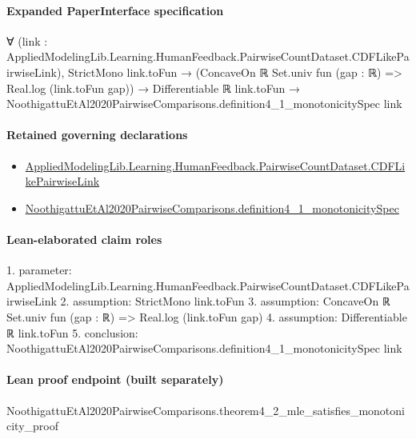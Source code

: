 \documentclass[10pt]{article}
\begin{document}
\paragraph{Expanded PaperInterface specification}
\begin{ReviewVerbatim}
∀ (link : AppliedModelingLib.Learning.HumanFeedback.PairwiseCountDataset.CDFLikePairwiseLink),
  StrictMono link.toFun →
    (ConcaveOn ℝ Set.univ fun (gap : ℝ) => Real.log (link.toFun gap)) →
      Differentiable ℝ link.toFun → NoothigattuEtAl2020PairwiseComparisons.definition4_1_monotonicitySpec link
\end{ReviewVerbatim}

\paragraph{Retained governing declarations}
\begin{itemize}\raggedright
\item \hyperlink{governing-declaration-3449f3559185d0fd}{Applied\allowbreak{}Modeling\allowbreak{}Lib.\allowbreak{}Learning.\allowbreak{}Human\allowbreak{}Feedback.\allowbreak{}Pairwise\allowbreak{}Count\allowbreak{}Dataset.\allowbreak{}CDF\allowbreak{}Like\allowbreak{}Pairwise\allowbreak{}Link}
\item \hyperlink{paper-prerequisite-01e3b5f8d1238d2d}{Noothigattu\allowbreak{}Et\allowbreak{}Al2020\allowbreak{}Pairwise\allowbreak{}Comparisons.\allowbreak{}definition4\_\allowbreak{}1\_\allowbreak{}monotonicity\allowbreak{}Spec}
\end{itemize}
\paragraph{Lean-elaborated claim roles}\begin{ReviewVerbatim}
1. parameter: AppliedModelingLib.Learning.HumanFeedback.PairwiseCountDataset.CDFLikePairwiseLink
2. assumption: StrictMono link.toFun
3. assumption: ConcaveOn ℝ Set.univ fun (gap : ℝ) => Real.log (link.toFun gap)
4. assumption: Differentiable ℝ link.toFun
5. conclusion: NoothigattuEtAl2020PairwiseComparisons.definition4_1_monotonicitySpec link
\end{ReviewVerbatim}

\paragraph{Lean proof endpoint (built separately)}\begin{ReviewVerbatim}
NoothigattuEtAl2020PairwiseComparisons.theorem4_2_mle_satisfies_monotonicity_proof
\end{ReviewVerbatim}
\end{document}
